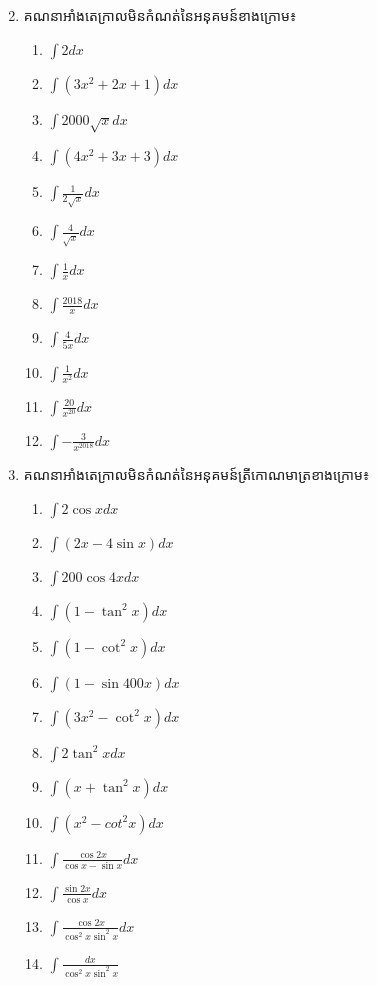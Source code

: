 \documentclass[12pt,a4paper]{article}
\def\hard{\leavevmode\makebox[0pt][r]{\large\ensuremath{\star}\hspace{2em}}}
\begin{document}
\begin{enumerate}[I]
\begin{multicols}{2}
\begin{enumerate}[a]
			\end{enumerate}
		\end{multicols}
		\item គណនាអាំងតេក្រាលមិនកំណត់នៃអនុគមន៍ខាងក្រោម៖
		\begin{multicols}{4}
			\begin{enumerate}[a]
				\item $\int 2 dx$
				\item $\int (3x^2+2x+1 ) dx$
				\item $\int 2000\sqrt{x} dx$
				\item $\int (4x^2+3x+3) dx$
				\item $\int \frac{1}{2\sqrt{x}} dx$
				\item $\int \frac{4}{\sqrt{x}} dx$
				\item $\int \frac{1}{x} dx$
				\item $\int \frac{2018}{x} dx$
				\item $\int \frac{4}{5x} dx$
				\item $\int \frac{1}{x^2} dx$
				\item $\int \frac{20}{x^{20} }dx$
				\item $\int -\frac{3}{x^{2018}} dx$
			\end{enumerate}
		\end{multicols}
		\item គណនាអាំងតេក្រាលមិនកំណត់នៃអនុគមន៍ត្រីកោណមាត្រខាងក្រោម៖
		\begin{multicols}{4}
			\begin{enumerate}[a]
				\item $\int 2\cos x dx$
				\item $\int (2x-4\sin x) dx$
				\item $\int 200\cos4x dx$
				\item $\int (1-\tan^2 x) dx$
				\item $\int (1-\cot^2 x) dx$
				\item $\int (1-\sin 400x) dx$
				\item $\int (3x^2-\cot^2 x) dx$
				\item $\int 2\tan^2x dx$
				\item $\int (x+\tan^2 x) dx$
				\item $\int (x^2-cot^2 x) dx$
				\item $\int \frac{\cos2x}{\cos x -\sin x}dx$
				\item $\int \frac{\sin2x}{\cos x} dx$
				\item\hard $\int \frac{\cos2x}{\cos^2x\sin^2x} dx$
				\item\hard $\int \frac{dx}{\cos^2x\sin^2x}$

\end{enumerate}
\end{multicols}
\end{enumerate}
\end{document}

